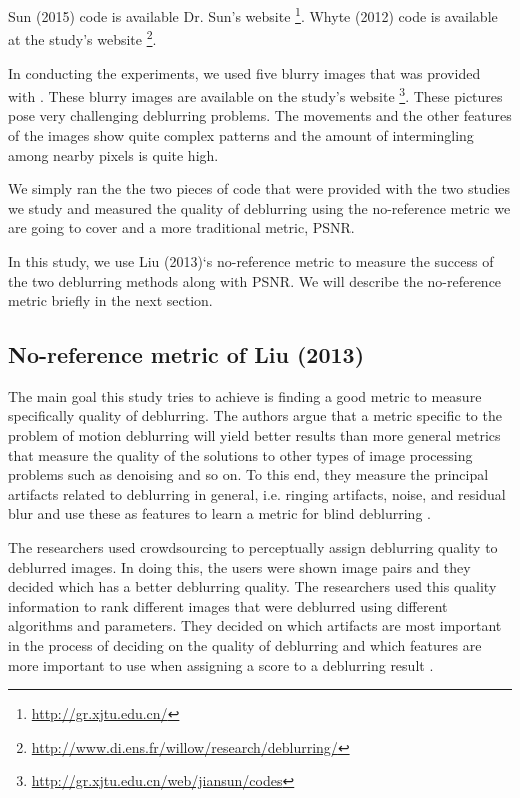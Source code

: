\documentclass[10pt,twocolumn,letterpaper]{article}
\begin{document}
Sun \etal (2015) code is available Dr. Sun's website \footnote{\url{http://gr.xjtu.edu.cn/}}. Whyte \etal (2012) code is available at the study's website \footnote{\url{http://www.di.ens.fr/willow/research/deblurring/}}.

In conducting the experiments, we used five blurry images that was provided with \cite{whyte2012non}. These blurry images are available on the study's website \footnote{\url{http://gr.xjtu.edu.cn/web/jiansun/codes}}. These pictures pose very challenging deblurring problems. The movements and the other features of the images show quite complex patterns and the amount of intermingling among nearby pixels is quite high.

We simply ran the the two pieces of code that were provided with the two studies we study and measured the quality of deblurring using the no-reference metric we are going to cover and a more traditional metric, PSNR.

In this study, we use Liu \etal (2013)`s no-reference metric to measure the success of the two deblurring methods along with PSNR. We will describe the no-reference metric briefly in the next section.

\subsection{No-reference metric of Liu \textbf{\etal} (2013)}
The main goal this study tries to achieve is finding a good metric to measure specifically quality of deblurring. The authors argue that a metric specific to the problem of motion deblurring will yield better results than more general metrics that measure the quality of the solutions to other types of image processing problems such as denoising and so on. To this end, they measure the principal artifacts related to deblurring in general, i.e. ringing artifacts, noise, and residual blur and use these as features to learn a metric for blind deblurring \cite{liu2013no}.

The researchers used crowdsourcing to perceptually assign deblurring quality to deblurred images. In doing this, the users were shown image pairs and they decided which has a better deblurring quality. The researchers used this quality information to rank different images that were deblurred using different algorithms and parameters. They decided on which artifacts are most important in the process of deciding on the quality of deblurring and which features are more important to use when assigning a score to a deblurring result \cite{liu2013no}.
\end{document}
